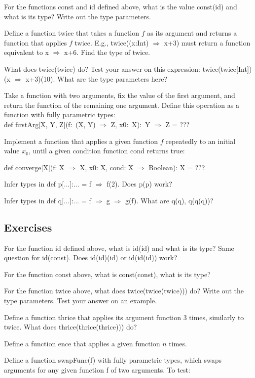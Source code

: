 For the functions const and id defined above, what is the value const(id)
and what is its type? Write out the type parameters.

Define a function twice that takes a function $f$ as its argument
and returns a function that applies $f$ twice. E.g., twice((x:Int)
$\Rightarrow$ x+3) must return a function equivalent to x $\Rightarrow$
x+6. Find the type of twice.

What does twice(twice) do? Test your answer on this expression: twice(twice{[}Int{]})(x
$\Rightarrow$ x+3)(10). What are the type parameters here?

Take a function with two arguments, fix the value of the first argument,
and return the function of the remaining one argument. Define this
operation as a function with fully parametric types:\\
def firstArg{[}X, Y, Z{]}(f:~(X, Y) $\Rightarrow$ Z, x0:~X):~Y
$\Rightarrow$ Z = ???

Implement a function that applies a given function $f$ repeatedly
to an initial value $x_{0}$, until a given condition function cond
returns true:

def converge{[}X{]}(f: X $\Rightarrow$ X, x0: X, cond: X $\Rightarrow$
Boolean): X = ???

Infer types in def p{[}...{]}:... = f $\Rightarrow$ f(2). Does p(p)
work?

Infer types in def q{[}...{]}:... = f $\Rightarrow$ g $\Rightarrow$
g(f). What are q(q), q(q(q))?

\subsection{Exercises}

For the function id defined above, what is id(id) and what is its
type? Same question for id(const). Does id(id)(id) or id(id(id)) work? 

For the function const above, what is const(const), what is its type?

For the function twice above, what does twice(twice(twice))) do? Write
out the type parameters. Test your answer on an example.

Define a function thrice that applies its argument function 3 times,
similarly to twice. What does thrice(thrice(thrice))) do?

Define a function ence that applies a given function $n$ times.

Define a function swapFunc(f) with fully parametric types, which swaps
arguments for any given function f of two arguments. To test: 

